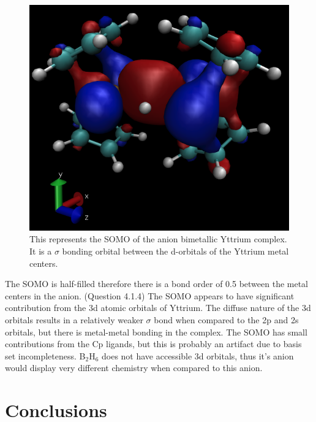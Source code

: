 \documentclass[11pt]{article}
\newcommand*{\comment}[1]{{\color{blue} #1}}
\begin{document}
\begin{figure}[htbp]
  \centering
  \includegraphics[scale=0.2]{83an.png}
  \caption{This represents the SOMO of the anion bimetallic Yttrium complex.
    It is a $\sigma$ bonding orbital between the d-orbitals of the Yttrium metal
    centers.}
\end{figure}


The SOMO is half-filled therefore there is a bond order of 0.5
between the metal centers in the anion. (Question 4.1.4)
The SOMO appears to have significant contribution from the 3d 
atomic orbitals of Yttrium. The diffuse nature of the 3d
orbitals results in a relatively weaker $\sigma$ bond when
compared to the 2p and 2s orbitals, but there is metal-metal
bonding in the complex. The SOMO has small contributions from the Cp
ligands, but this is probably an artifact due to basis set
incompleteness. B$_2$H$_6$ does not have accessible 3d orbitals,
thus it's anion would display very different chemistry when
compared to this anion.



\section{Conclusions}
\end{document}
